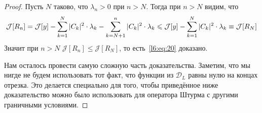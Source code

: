 \documentclass[12pt,a4paper,openany,fleqn]{book}
\newcommand{\J}{\ensuremath{\mathcal{J}}}
\newcommand{\mc}[1]{\ensuremath{\mathcal{#1}}}
\theoremstyle{definition}
\begin{document}
\begin{proof}
		\noindent Пусть $N$ таково, что $\lambda_n>0$ при $n>N$. Тогда при $n>N$ видим, что 
		\begin{equation*}
			\hfill\J[R_n]=\J[y]-\sum\limits_{k=1}^{N}|C_k|^2\cdot\lambda_k-\sum\limits_{k=N+1}^{n}|C_k|^2\cdot\lambda_k\leqslant\J[y]-\sum\limits_{k=1}^{N}|C_k|^2\cdot\lambda_k\equiv\J[R_N]\hfill
		\end{equation*} 
		Значит при $n>N$ $\J[R_n]\leqslant\J[R_N]$, то есть~\eqref{l6:eq:20} доказано.
		
		Нам осталось провести самую сложную часть доказательства. Заметим, что мы нигде не будем использовать тот факт, что функции из $\mc{D}_L$ равны нулю на концах отрезка. Это делается специально для того, чтобы приведённое ниже доказательство можно было использовать для оператора Штурма с другими граничными условиями. 
		

\end{proof}
\end{document}
